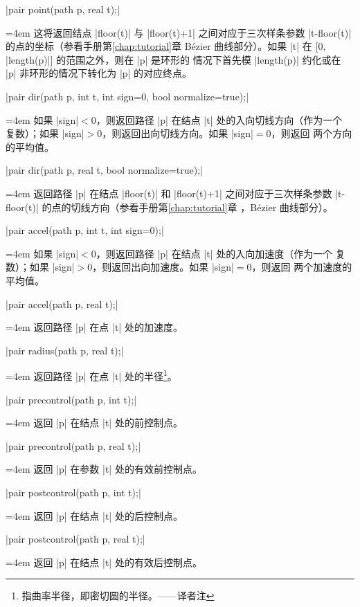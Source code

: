 \documentclass[nofonts,CJKnormalspaces]{ctexbook}[2009/05/20]
\makeatletter
\newenvironment{funclist}{\trivlist
  \parindent=0pt
\item[]
  \def\item{\medskip\par\leftskip=0pt}
  \def\go{\par\leftskip=4em}}
{\endtrivlist}
\newenvironment{typelist}{\itemize
  \let\old@item\@item
  \def\@item[##1]{\expandafter\old@item[\ttfamily\color{type!50!black}##1]}}
{\enditemize}
\newcommand\transnote[1]{\footnote{#1——译者注}}
\makeatother
\begin{document}
\begin{typelist}
\begin{funclist}
\item |pair point(path p, real t);| \go
  这将返回结点 |floor(t)| 与 |floor(t)+1| 之间对应于三次样条参数 |t-floor(t)|
  的点的坐标（参看手册第\ref{chap:tutorial}章 Bézier
  曲线部分）。如果 |t| 在 $[0,{}$|length(p)|$]$ 的范围之外，则在 |p| 是环形的
  情况下首先模 |length(p)| 约化或在 |p| 非环形的情况下转化为 |p| 的对应终点。

\item |pair dir(path p, int t, int sign=0, bool normalize=true);| \go
  如果 |sign|${}<0$，则返回路径 |p| 在结点 |t| 处的入向切线方向（作为一个
  复数）；如果 |sign|${}>0$，则返回出向切线方向。如果 |sign|${}=0$，则返回
  两个方向的平均值。

\item |pair dir(path p, real t, bool normalize=true);| \go
  返回路径 |p| 在结点 |floor(t)| 和 |floor(t)+1| 之间对应于三次样条参数
  |t-floor(t)| 的点的切线方向（参看手册第\ref{chap:tutorial}章%
  ，Bézier 曲线部分）。

\item |pair accel(path p, int t, int sign=0);| \go
  如果 |sign|${}<0$，则返回路径 |p| 在结点 |t| 处的入向加速度（作为一个
  复数）；如果 |sign|${}>0$，则返回出向加速度。如果 |sign|${}=0$，则返回
  两个加速度的平均值。

\item |pair accel(path p, real t);| \go
  返回路径 |p| 在点 |t| 处的加速度。

\item |pair radius(path p, real t);| \go
  返回路径 |p| 在点 |t| 处的半径\transnote{指曲率半径，即密切圆的半径。}。

\item |pair precontrol(path p, int t);| \go
  返回 |p| 在结点 |t| 处的前控制点。

\item |pair precontrol(path p, real t);| \go
  返回 |p| 在参数 |t| 处的有效前控制点。

\item |pair postcontrol(path p, int t);| \go
  返回 |p| 在结点 |t| 处的后控制点。

\item |pair postcontrol(path p, real t);| \go
  返回 |p| 在结点 |t| 处的有效后控制点。


\end{funclist}
\end{typelist}
\end{document}
